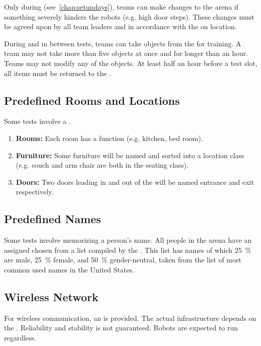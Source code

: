 \noindent Only during \SetupDays{} (see~\ref{chap:setupdays}), teams can make changes to the arena if something severely hinders the robots (e.g. high door steps). These changes must be agreed upon by all team leaders and in accordance with the \TC{} on location.

During \SetupDays{} and in between tests, teams can take objects from the \Arena{} for training. A team may not take more than five objects at once and for longer than an hour. Teams may not modify any of the objects. At least half an hour before a test slot, all items must be returned to the \Arena{}.


\subsection{Predefined Rooms and Locations}
\textit{\label{sec:rules:scenario:locations}}
Some tests involve a \PredefinedLocation{}.
\begin{enumerate}
	\item \textbf{Rooms:} Each room has a function (e.g. kitchen, bed room).
	
	\item \textbf{Furniture:} Some furniture will be named and sorted into a location class (e.g. couch and arm chair are both in the seating class). 
	
	\item \textbf{Doors:} Two doors leading in and out of the \Arena{} will be named entrance and exit respectively.
\end{enumerate}


\subsection{Predefined Names}
\label{sec:rules:scenario:names}
Some tests involve memorizing a person's name. All people in the arena have an assigned \PredefinedName{} chosen from a list compiled by the \TC{}. This list has \NumNames{} names of which \SI{25}{\percent} are male, \SI{25}{\percent} female, and \SI{50}{\percent} gender-neutral, taken from the list of most common used names in the United States.


\subsection{Wireless Network}
\label{sec:rules:scenario:wifi}

For wireless communication, an \ArenaNetwork{} is provided. The actual infrastructure depends on the \LOC{}. Reliability and stability is not guaranteed. Robots are expected to run regardless.

